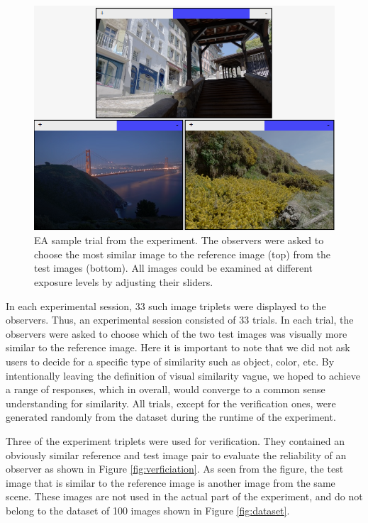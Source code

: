 \begin{figure}
\begin{center}
\includegraphics[width=\textwidth]{figures/chapter3/experiment.png}
\caption{EA sample trial from the experiment. The observers were asked to choose the most similar image to the reference image (top) from the test images (bottom). All images could be examined at different exposure levels by adjusting their sliders.
}
\label{fig:experiment}
\end{center}
\end{figure}

In each experimental session, 33 such image triplets were displayed to the observers. Thus, an experimental session consisted of 33 trials. In each trial, the observers were asked to choose which of the two test images was visually more similar to the reference image. Here it is important to note that we did not ask users to decide for a specific type of similarity such as object, color, etc. By intentionally leaving the definition of visual similarity vague, we hoped to achieve a range of responses, which in overall, would converge to a common sense understanding for similarity. All trials, except for the verification ones, were generated randomly from the dataset during the runtime of the experiment. 

Three of the experiment triplets were used for verification. They contained an obviously similar reference and test image pair to evaluate the reliability of an observer as shown in Figure \ref{fig:verficiation}. As seen from the figure, the test image that is similar to the reference image is another image from the same scene. These images are not used in the actual part of the experiment, and do not belong to the dataset of 100 images shown in Figure \ref{fig:dataset}.

